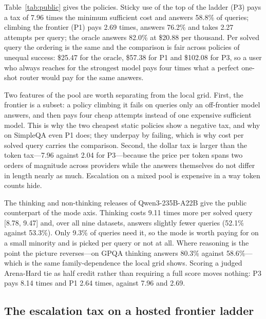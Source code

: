 \documentclass[final,5p,times,twocolumn]{elsarticle}
\theoremstyle{plain}
\begin{document}
Table~\ref{tab:public} gives the policies. Sticky use of the top of the
ladder (P3) pays a tax of 7.96 times the minimum sufficient cost and answers
58.8\% of queries; climbing the frontier (P1) pays 2.69 times, answers 76.2\%
and takes 2.27 attempts per query; the oracle answers 82.0\% at \$20.88 per
thousand. Per solved query the ordering is the same and the comparison is
fair across policies of unequal success: \$25.47 for the oracle, \$57.38 for
P1 and \$102.08 for P3, so a user who always reaches for the strongest model
pays four times what a perfect one-shot router would pay for the same
answers.

Two features of the pool are worth separating from the local grid. First, the
frontier is a subset: a policy climbing it fails on queries only an
off-frontier model answers, and then pays four cheap attempts instead of one
expensive sufficient model. This is why the two cheapest static policies show
a negative tax, and why on SimpleQA even P1 does; they underpay by failing,
which is why cost per solved query carries the comparison. Second, the dollar
tax is larger than the token tax---7.96 against 2.04 for P3---because the
price per token spans two orders of magnitude across providers while the
answers themselves do not differ in length nearly as much. Escalation on a
mixed pool is expensive in a way token counts hide.

The thinking and non-thinking releases of Qwen3-235B-A22B give the public
counterpart of the mode axis. Thinking costs 9.11 times more per solved query
[8.78, 9.47] and, over all nine datasets, answers slightly fewer queries
(52.1\% against 53.3\%). Only 9.3\% of queries need it, so the mode is worth
paying for on a small minority and is picked per query or not at all. Where
reasoning is the point the picture reverses---on GPQA thinking answers 80.3\%
against 58.6\%---which is the same family-dependence the local grid shows.
Scoring a judged Arena-Hard tie as half credit rather than requiring a full
score moves nothing: P3 pays 8.14 times and P1 2.64 times, against 7.96 and
2.69.

\subsection{The escalation tax on a hosted frontier ladder}
\label{sec:results-hosted}
\end{document}
